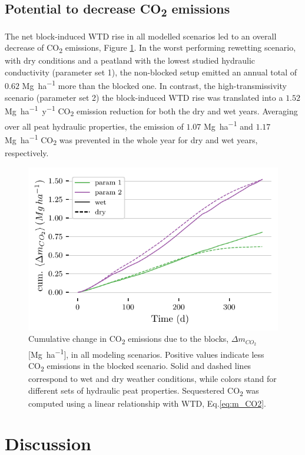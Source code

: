 \documentclass[bg, manuscript]{copernicus}
\begin{document}
\subsection{Potential to decrease CO\textsubscript{2} emissions}
The net block-induced WTD rise in all modelled scenarios led to an overall decrease of CO\textsubscript{2} emissions, Figure \ref{fig:cum_CO2}.
In the worst performing rewetting scenario, with dry conditions and a peatland with the lowest studied hydraulic conductivity (parameter set 1), the non-blocked setup emitted an annual total of $0.62$ \unit{Mg ha^{-1}} more than the blocked one.
In contrast, the high-transmissivity scenario (parameter set 2) the block-induced WTD rise was translated into a $1.52$ \unit{Mg ha^{-1} y^{-1}} CO\textsubscript{2} emission reduction for both the dry and wet years.
Averaging over all peat hydraulic properties, the emission of $1.07$ \unit{Mg ha^{-1}} and $1.17$ \unit{Mg ha^{-1}} CO\textsubscript{2} was prevented in the whole year for dry and wet years, respectively.


\begin{figure}[t]
\includegraphics[width=8.3 cm]{figs/all_params_daily_cumulative_CO2.pdf}
\caption{Cumulative change in CO\textsubscript{2} emissions due to the blocks, $\Delta m_{CO_2}$ [\unit{Mg ha^{-1}}], in all modeling scenarios. Positive values indicate less CO\textsubscript{2} emissions in the blocked scenario. Solid and dashed lines correspond to wet and dry weather conditions, while colors stand for different sets of hydraulic peat properties. Sequestered CO\textsubscript{2} was computed using a linear relationship with WTD, Eq.\eqref{eq:m_CO2}.}
\label{fig:cum_CO2}
\end{figure}   


\section{Discussion}
\end{document}

